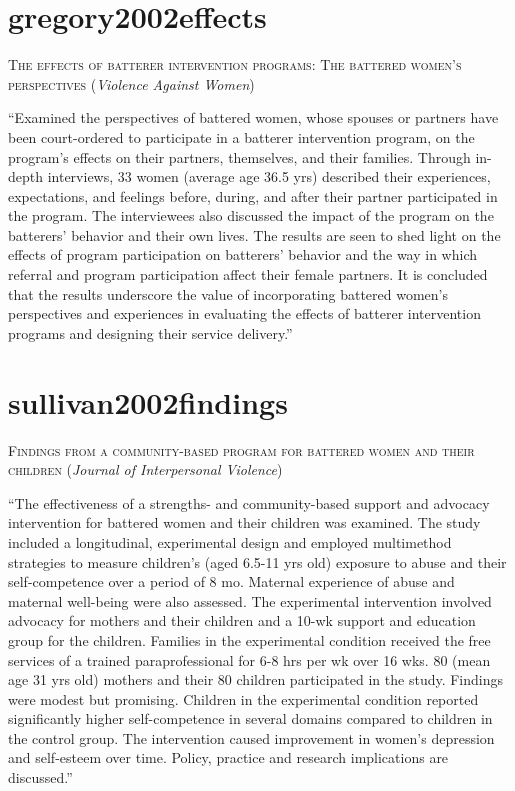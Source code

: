 \documentclass[]{tufte-handout}
\begin{document}
\section{\texorpdfstring{\textcolor[HTML]{5b0057}{gregory2002effects}}{}}\label{section-3}

\textsc{\large{The effects of batterer intervention programs: The battered women's perspectives}}
(\emph{Violence Against Women})

``Examined the perspectives of battered women, whose spouses or partners
have been court-ordered to participate in a batterer intervention
program, on the program's effects on their partners, themselves, and
their families. Through in-depth interviews, 33 women (average age 36.5
yrs) described their experiences, expectations, and feelings before,
during, and after their partner participated in the program. The
interviewees also discussed the impact of the program on the batterers'
behavior and their own lives. The results are seen to shed light on the
effects of program participation on batterers' behavior and the way in
which referral and program participation affect their female partners.
It is concluded that the results underscore the value of incorporating
battered women's perspectives and experiences in evaluating the effects
of batterer intervention programs and designing their service
delivery.''

\section{\texorpdfstring{\textcolor[HTML]{5b0057}{sullivan2002findings}}{}}\label{section-4}

\textsc{\large{Findings from a community-based program for battered women and their children}}
(\emph{Journal of Interpersonal Violence})

``The effectiveness of a strengths- and community-based support and
advocacy intervention for battered women and their children was
examined. The study included a longitudinal, experimental design and
employed multimethod strategies to measure children's (aged 6.5-11 yrs
old) exposure to abuse and their self-competence over a period of 8 mo.
Maternal experience of abuse and maternal well-being were also assessed.
The experimental intervention involved advocacy for mothers and their
children and a 10-wk support and education group for the children.
Families in the experimental condition received the free services of a
trained paraprofessional for 6-8 hrs per wk over 16 wks. 80 (mean age 31
yrs old) mothers and their 80 children participated in the study.
Findings were modest but promising. Children in the experimental
condition reported significantly higher self-competence in several
domains compared to children in the control group. The intervention
caused improvement in women's depression and self-esteem over time.
Policy, practice and research implications are discussed.''
\end{document}
